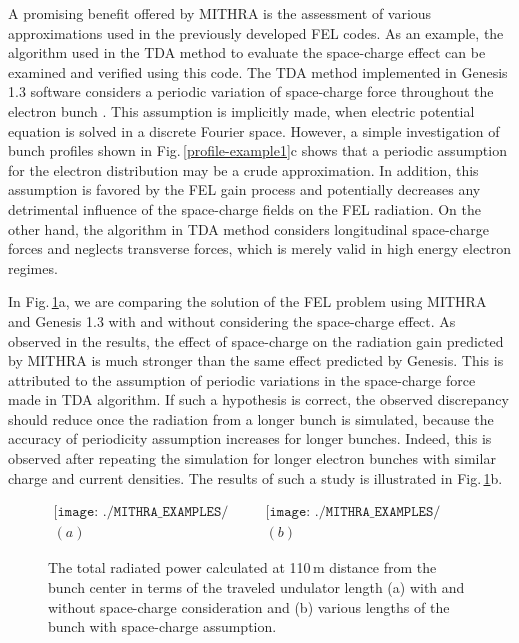 A promising benefit offered by MITHRA is the assessment of various approximations used in the previously developed FEL codes.
%
As an example, the algorithm used in the TDA method to evaluate the space-charge effect can be examined and verified using this code.
%
The TDA method implemented in Genesis 1.3 software considers a periodic variation of space-charge force throughout the electron bunch \cite{tranFEL,reiche2000numerical}.
%
This assumption is implicitly made, when electric potential equation is solved in a discrete Fourier space.
%
However, a simple investigation of bunch profiles shown in Fig.\,\ref{profile-example1}c shows that a periodic assumption for the electron distribution may be a crude approximation.
%
In addition, this assumption is favored by the FEL gain process and potentially decreases any detrimental influence of the space-charge fields on the FEL radiation.
%
On the other hand, the algorithm in TDA method considers longitudinal space-charge forces and neglects transverse forces, which is merely valid in high energy electron regimes.

In Fig.\,\ref{spaceChargeEffect}a, we are comparing the solution of the FEL problem using MITHRA and Genesis 1.3 with and without considering the space-charge effect.
%
As observed in the results, the effect of space-charge on the radiation gain predicted by MITHRA is much stronger than the same effect predicted by Genesis.
%
This is attributed to the assumption of periodic variations in the space-charge force made in TDA algorithm.
%
If such a hypothesis is correct, the observed discrepancy should reduce once the radiation from a longer bunch is simulated, because the accuracy of periodicity assumption increases for longer bunches.
%
Indeed, this is observed after repeating the simulation for longer electron bunches with similar charge and current densities.
%
The results of such a study is illustrated in Fig.\,\ref{spaceChargeEffect}b.
%
\begin{figure}
\centering
$\begin{array}{cc}
\texttt{[image: ./MITHRA\_EXAMPLES/Fig4/Fig4a.pdf]} & \texttt{[image: ./MITHRA\_EXAMPLES/Fig4/Fig4b.pdf]} \\
(a) & (b)
\end{array}$
\caption{The total radiated power calculated at 110\,{\textmu}m distance from the bunch center in terms of the traveled undulator length (a) with and without space-charge consideration and (b) various lengths of the bunch with space-charge assumption.}
\label{spaceChargeEffect}
\end{figure}

